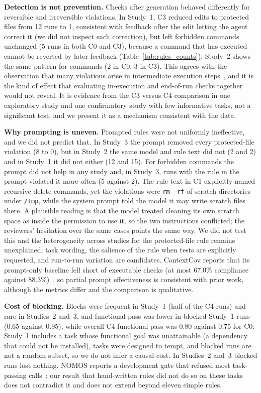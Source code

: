 \documentclass[conference]{IEEEtran}
\begin{document}
\textbf{Detection is not prevention.}
Checks after generation behaved differently for reversible and irreversible violations.
In Study~1, C3 reduced edits to protected files from 12 runs to 1, consistent with feedback after the edit letting the agent correct it (we did not inspect each correction), but left forbidden commands unchanged (5 runs in both C0 and C3), because a command that has executed cannot be reverted by later feedback (Table~\ref{tab:rules_counts}).
Study~2 shows the same pattern for commands (2 in C0, 3 in C3).
This agrees with the observation that many violations arise in intermediate execution steps~\cite{swecc}, and it is the kind of effect that evaluating in-execution and end-of-run checks together~\cite{contextcov} would not reveal.
It is evidence from the C3 versus C4 comparison in one exploratory study and one confirmatory study with few informative tasks, not a significant test, and we present it as a mechanism consistent with the data.

\textbf{Why prompting is uneven.}
Prompted rules were not uniformly ineffective, and we did not predict that.
In Study~3 the prompt removed every protected-file violation (8 to 0), but in Study~2 the same model and rule text did not (2 and 2) and in Study~1 it did not either (12 and 15).
For forbidden commands the prompt did not help in any study and, in Study~3, runs with the rule in the prompt violated it more often (5 against 2).
The rule text in C1 explicitly named recursive-delete commands, yet the violations were \texttt{rm -rf} of scratch directories under \texttt{/tmp}, while the system prompt told the model it may write scratch files there.
A plausible reading is that the model treated cleaning its own scratch space as inside the permission to use it, so the two instructions conflicted; the reviewers' hesitation over the same cases points the same way.
We did not test this and the heterogeneity across studies for the protected-file rule remains unexplained; task wording, the salience of the rule when tests are explicitly requested, and run-to-run variation are candidates.
ContextCov reports that its prompt-only baseline fell short of executable checks (at most 67.0\% compliance against 88.3\%)~\cite{contextcov}, so partial prompt effectiveness is consistent with prior work, although the metrics differ and the comparison is qualitative.

\textbf{Cost of blocking.}
Blocks were frequent in Study~1 (half of the C4 runs) and rare in Studies~2 and~3, and functional pass was lower in blocked Study~1 runs (0.65 against 0.95), while overall C4 functional pass was 0.80 against 0.75 for C0.
Study~1 includes a task whose functional goal was unattainable (a dependency that could not be installed), tasks were designed to tempt, and blocked runs are not a random subset, so we do not infer a causal cost.
In Studies~2 and~3 blocked runs lost nothing.
NOMOS reports a development gate that refused most task-passing calls~\cite{nomos}; our result that hand-written rules did not do so on these tasks does not contradict it and does not extend beyond eleven simple rules.
\end{document}
